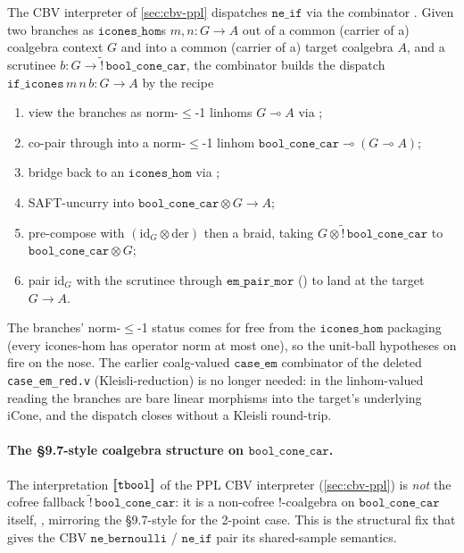 \begin{definition}\label{def:cbv-case-em}
\rocqok
{}
The CBV interpreter of \autoref{sec:cbv-ppl} dispatches
$\mathtt{ne\_if}$ via the combinator
. Given two branches as
$\mathtt{icones\_hom}$s $m, n : G \to A$ out of a common (carrier of a)
coalgebra context $G$ and into a common (carrier of a) target
coalgebra $A$, and a scrutinee
$b : G \to \widetilde{\mathord{!}}\,\mathtt{bool\_cone\_car}$, the
combinator builds the dispatch $\mathtt{if\_icones}\,m\,n\,b : G \to A$
by the recipe
\begin{enumerate}
  \item view the branches as norm-$\leq$-1 linhoms
    $G \multimap A$ via ;
  \item co-pair through
     into a
    norm-$\leq$-1 linhom
    $\mathtt{bool\_cone\_car} \multimap (G \multimap A)$;
  \item bridge back to an $\mathtt{icones\_hom}$ via
    ;
  \item SAFT-uncurry into $\mathtt{bool\_cone\_car} \otimes G \to A$;
  \item pre-compose with $(\mathrm{id}_G \otimes \mathrm{der})$ then a
    braid, taking $G \otimes \widetilde{\mathord{!}}\,\mathtt{bool\_cone\_car}$
    to $\mathtt{bool\_cone\_car} \otimes G$;
  \item pair $\mathrm{id}_G$ with the scrutinee through
    $\mathtt{em\_pair\_mor}$
    () to land at the
    target $G \to A$.
\end{enumerate}
The branches' norm-$\leq$-1 status comes for free from the
$\mathtt{icones\_hom}$ packaging (every icones-hom has operator norm
at most one), so the unit-ball hypotheses on
 fire on the
nose. The earlier coalg-valued $\mathtt{case\_em}$ combinator of the
deleted \texttt{case\_em\_red.v} (Kleisli-reduction) is no longer
needed: in the linhom-valued reading the branches are bare linear
morphisms into the target's underlying iCone, and the dispatch closes
without a Kleisli round-trip.
\end{definition}

\paragraph{The \S9.7-style coalgebra structure on
$\mathtt{bool\_cone\_car}$.}
The interpretation $[\![ \mathtt{tbool} ]\!]$ of the PPL CBV interpreter
(\autoref{sec:cbv-ppl}) is \emph{not} the cofree fallback
$\widetilde{\mathord{!}}\,\mathtt{bool\_cone\_car}$: it is a non-cofree
$\mathord{!}$-coalgebra on $\mathtt{bool\_cone\_car}$ itself,
, mirroring the
\S9.7-style  for the 2-point
case. This is the structural fix that gives the CBV
$\mathtt{ne\_bernoulli}$ / $\mathtt{ne\_if}$ pair its shared-sample
semantics.

